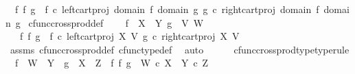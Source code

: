 \begin{isabellebody}
\ \ {\isachardoublequoteopen}f\ {\isasymtimes}\isactrlsub f\ g\ {\isacharequal}{\kern0pt}\ {\isasymlangle}f\ {\isasymcirc}\isactrlsub c\ left{\isacharunderscore}{\kern0pt}cart{\isacharunderscore}{\kern0pt}proj\ {\isacharparenleft}{\kern0pt}domain\ f{\isacharparenright}{\kern0pt}\ {\isacharparenleft}{\kern0pt}domain\ g{\isacharparenright}{\kern0pt}{\isacharcomma}{\kern0pt}\ g\ {\isasymcirc}\isactrlsub c\ right{\isacharunderscore}{\kern0pt}cart{\isacharunderscore}{\kern0pt}proj\ {\isacharparenleft}{\kern0pt}domain\ f{\isacharparenright}{\kern0pt}\ {\isacharparenleft}{\kern0pt}domain\ g{\isacharparenright}{\kern0pt}{\isasymrangle}{\isachardoublequoteclose}\isanewline
\isanewline
{}\isamarkupfalse%
\ cfunc{\isacharunderscore}{\kern0pt}cross{\isacharunderscore}{\kern0pt}prod{\isacharunderscore}{\kern0pt}def{}{\isacharcolon}{\kern0pt}\ \isanewline
\ \ \ {\isachardoublequoteopen}f\ {\isacharcolon}{\kern0pt}\ X\ {\isasymrightarrow}\ Y{\isachardoublequoteclose}\ {\isachardoublequoteopen}g\ {\isacharcolon}{\kern0pt}\ V{\isasymrightarrow}\ W{\isachardoublequoteclose}\isanewline
\ \ \ {\isachardoublequoteopen}f\ {\isasymtimes}\isactrlsub f\ g\ {\isacharequal}{\kern0pt}\ {\isasymlangle}f\ {\isasymcirc}\isactrlsub c\ left{\isacharunderscore}{\kern0pt}cart{\isacharunderscore}{\kern0pt}proj\ X\ V{\isacharcomma}{\kern0pt}\ g\ {\isasymcirc}\isactrlsub c\ right{\isacharunderscore}{\kern0pt}cart{\isacharunderscore}{\kern0pt}proj\ X\ V{\isasymrangle}{\isachardoublequoteclose}\isanewline
%
\isadelimproof
\ \ %
\endisadelimproof
%
\isatagproof
{}\isamarkupfalse%
\ assms\ cfunc{\isacharunderscore}{\kern0pt}cross{\isacharunderscore}{\kern0pt}prod{\isacharunderscore}{\kern0pt}def\ cfunc{\isacharunderscore}{\kern0pt}type{\isacharunderscore}{\kern0pt}def\ \isamarkupfalse%
\ auto%
\endisatagproof
{\isafoldproof}%
%
\isadelimproof
\isanewline
%
\endisadelimproof
\ \ \ \ \isanewline
{}\isamarkupfalse%
\ cfunc{\isacharunderscore}{\kern0pt}cross{\isacharunderscore}{\kern0pt}prod{\isacharunderscore}{\kern0pt}type{\isacharbrackleft}{\kern0pt}type{\isacharunderscore}{\kern0pt}rule{\isacharbrackright}{\kern0pt}{\isacharcolon}{\kern0pt}\isanewline
\ \ {\isachardoublequoteopen}f\ {\isacharcolon}{\kern0pt}\ W\ {\isasymrightarrow}\ Y\ {\isasymLongrightarrow}\ g\ {\isacharcolon}{\kern0pt}\ X\ {\isasymrightarrow}\ Z\ {\isasymLongrightarrow}\ f\ {\isasymtimes}\isactrlsub f\ g\ {\isacharcolon}{\kern0pt}\ W\ {\isasymtimes}\isactrlsub c\ X\ {\isasymrightarrow}\ Y\ {\isasymtimes}\isactrlsub c\ Z{\isachardoublequoteclose}\isanewline

\end{isabellebody}
